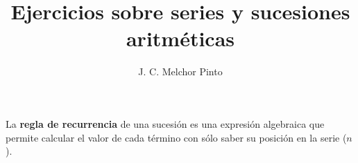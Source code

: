 \documentclass[12pt,addpoints,answers]{guia}
\title{Ejercicios sobre series y sucesiones aritméticas}
\author{J. C. Melchor Pinto}
\begin{document}
\pagestyle{headandfoot}

\INFO
\vspace{-2em}
\begin{multicols}{2}
    
    
    \columnbreak
    
    
\end{multicols}
\begin{importantbox}
    La \textbf{regla de recurrencia} de una sucesión es una expresión algebraica que permite calcular el valor de cada término con sólo saber su posición en la serie ($n$).
\end{importantbox}
\newpage
\begin{questions}
    \questionboxed[10]{}
    \questionboxed[10]{}
    \questionboxed[10]{}
    \questionboxed[10]{}
    \questionboxed[10]{}
    \questionboxed[10]{}
    \questionboxed[10]{}
    \questionboxed[10]{}
    \questionboxed[10]{}
    \questionboxed[10]{}
\end{questions}

\end{document}
